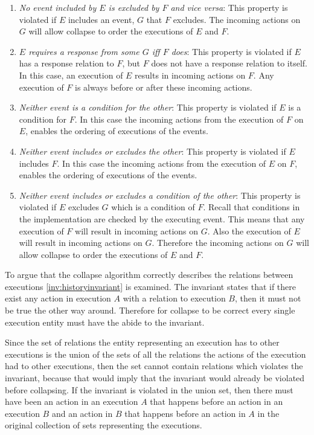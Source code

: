 	\begin{enumerate}
		\item \textit{No event included by $E$ is excluded by $F$ and vice versa}: This property is violated if $E$ includes an event, $G$ that $F$ excludes. The incoming actions on $G$ will allow collapse to order the executions of $E$ and $F$.
		\item \textit{$E$ requires a response from some $G$ iff $F$ does}: This property is violated if $E$ has a response relation to $F$, but $F$ does not have a response relation to itself. In this case, an execution of $E$ results in incoming actions on $F$. Any execution of $F$ is always before or after these incoming actions.
		\item \textit{Neither event is a condition for the other}: This property is violated if $E$ is a condition for $F$. In this case the incoming actions from the execution of $F$ on $E$, enables the ordering of executions of the events.
		\item \textit{Neither event includes or excludes the other}: This property is violated if $E$ includes $F$. In this case the incoming actions from the execution of $E$ on $F$, enables the ordering of executions of the events.
		\item \textit{Neither event includes or excludes a condition of the other}: This property is violated if $E$ excludes $G$ which is a condition of $F$. Recall that conditions in the implementation are checked by the executing event. This means that any execution of $F$ will result in incoming actions on $G$. Also the execution of $E$ will result in incoming actions on $G$. Therefore the incoming actions on $G$ will allow collapse to order the executions of $E$ and $F$.
	\end{enumerate}
	
	To argue that the collapse algorithm correctly describes the relations between executions \autoref{inv:historyinvariant} is examined. The invariant states that if there exist any action in execution $A$ with a relation to execution $B$, then it must not be true the other way around. Therefore for collapse to be correct every single execution entity must have the abide to the invariant. 
	
	Since the set of relations the entity representing an execution has to other executions is the union of the sets of all the relations the actions of the execution had to other executions, then the set cannot contain relations which violates the invariant, because that would imply that the invariant would already be violated before collapsing. If the invariant is violated in the union set, then there must have been an action in an execution $A$ that happens before an action in an execution $B$ and an action in $B$ that happens before an action in $A$ in the original collection of sets representing the executions.
	
